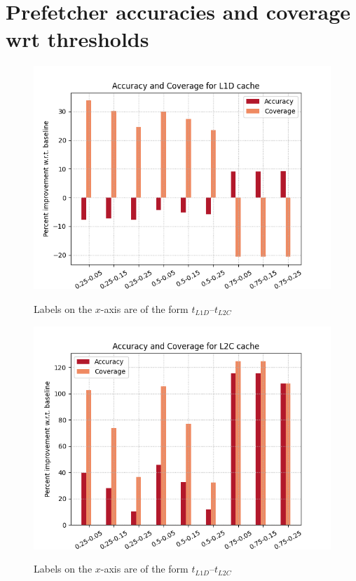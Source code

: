 \documentclass[11pt, swedish, openany]{book}
\begin{document}
\section{Prefetcher accuracies and coverage wrt thresholds}
\label{section:ac}

\begin{figure}[H]
    \centering
    {\includegraphics[scale = 0.7]{images/combined_L1D.png}}
    \caption{Labels on the $x$-axis are of the form $t_{L1D}$--$t_{L2C}$}
    \label{fig:cl1d}
\end{figure}

\begin{figure}[H]
    \centering
    {\includegraphics[scale = 0.7]{images/combined_L2C.png}}
    \caption{Labels on the $x$-axis are of the form $t_{L1D}$--$t_{L2C}$}
    \label{fig:cl2c}
\end{figure}
\end{document}
